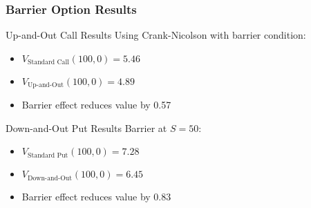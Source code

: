 \documentclass[aspectratio=169]{beamer}
\begin{document}
\begin{frame}
\frametitle{Barrier Option Results}
\begin{block}{Up-and-Out Call Results}
Using Crank-Nicolson with barrier condition:
\begin{itemize}
\item \(V_{\text{Standard Call}}(100, 0) = 5.46\)
\item \(V_{\text{Up-and-Out}}(100, 0) = 4.89\)
\item Barrier effect reduces value by 0.57
\end{itemize}
\end{block}

\begin{block}{Down-and-Out Put Results}
Barrier at \(S = 50\):
\begin{itemize}
\item \(V_{\text{Standard Put}}(100, 0) = 7.28\)
\item \(V_{\text{Down-and-Out}}(100, 0) = 6.45\)
\item Barrier effect reduces value by 0.83
\end{itemize}
\end{block}
\end{frame}
\end{document}
